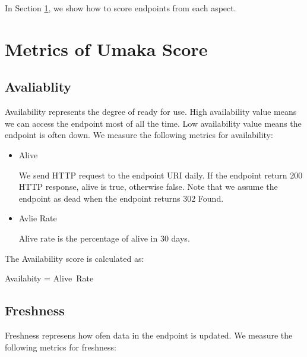 \documentclass[11pt,a4paper]{article}
\begin{document}
In Section \ref{metrics}, we show how to score endpoints from each aspect.

\section{Metrics of Umaka Score} \label{metrics}

\subsection{Avaliablity}

Availability represents the degree of ready for use. High availability value means we can access the endpoint most of all the time. Low availability value means the endpoint is often down.
We measure the following metrics for availability:

\begin{itemize}

\item Alive

We send HTTP request to the endpoint URI daily. If the endpoint return 200 HTTP response, alive is true, otherwise false.
Note that we assume the endpoint as dead when the endpoint returns 302 Found.

\item Avlie Rate

Alive rate is the percentage of alive in 30 days.

\end{itemize}

The Availability score is calculated as:

\begin{mdframed}
  \center
Availabity = Alive~Rate
\end{mdframed}

\subsection{Freshness}

Freshness represens how ofen data in the endpoint is updated.
We measure the following metrics for freshness:
\end{document}
